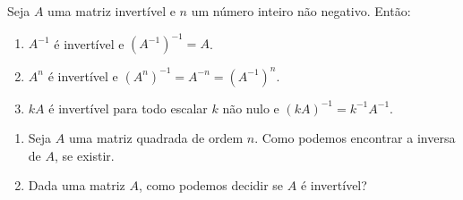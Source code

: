 \documentclass{beamer}
\begin{document}
    \begin{frame}
        \begin{proposicao}
            Seja $A$ uma matriz invertível \pause e $n$ um número inteiro não negativo. \pause Então:\pause
            \begin{enumerate}[label={\roman*})]
                \item $A^{-1}$ é invertível \pause e $(A^{-1})^{-1} = A$.\pause

                \item $A^n$ é invertível \pause e $(A^n)^{-1} = A^{-n} = (A^{-1})^n$.\pause

                \item $kA$ é invertível \pause para todo escalar $k$ não nulo \pause e $(kA)^{-1} = k^{-1}A^{-1}$.
            \end{enumerate}
        \end{proposicao}
    \end{frame}

    \begin{frame}
        \begin{enumerate}[label={\arabic*})]
            \item Seja $A$ uma matriz quadrada de ordem $n$. \pause Como podemos encontrar a inversa de $A$, \pause se existir.\pause

            \vspace{1cm}

            \item Dada uma matriz $A$, \pause como podemos decidir se $A$ é invertível?
        \end{enumerate}
    \end{frame}
\end{document}
